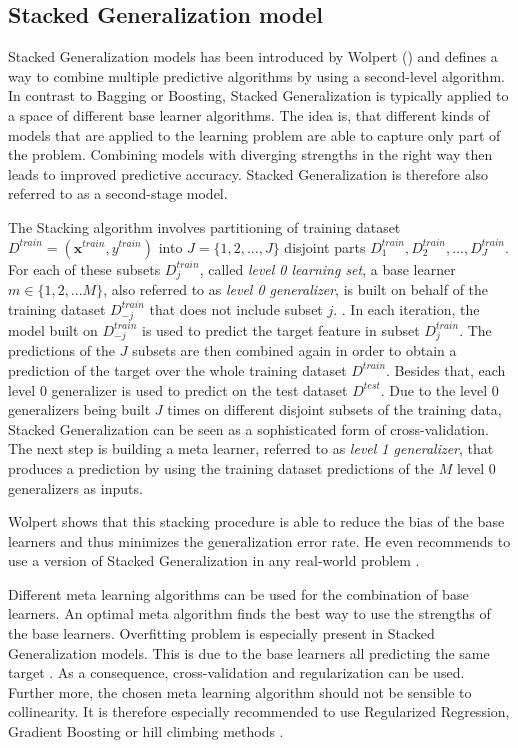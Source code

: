 \documentclass[12pt]{article}
\begin{document}

\subsection{Stacked Generalization model}\label{stacking}
Stacked Generalization models has been introduced by Wolpert (\citeyear{wolpert1992stacked}) and defines a way to combine multiple predictive algorithms by using a second-level algorithm. In contrast to Bagging or Boosting, Stacked Generalization is typically applied to a space of different base learner algorithms. The idea is, that different kinds of models that are applied to the learning problem are able to capture only part of the problem. Combining models with diverging strengths in the right way then leads to improved predictive accuracy. Stacked Generalization is therefore also referred to as a second-stage model.

The Stacking algorithm involves partitioning of training dataset $D^{train} = (\mathbf{x}^{train}, y^{train})$ into $J = \{1, 2,..., J\}$ disjoint parts $D^{train}_1, D^{train}_2,..., D^{train}_J$. For each of these subsets $D^{train}_j$, called \textit{level 0 learning set}, a base learner $m \in \{1,2,...M\}$, also referred to as \textit{level 0 generalizer}, is built on behalf of the training dataset $D^{train}_{-j}$ that does not include subset $j$. \citep[cp.]{wolpert1992stacked}. In each iteration, the model built on $D^{train}_{-j}$ is used to predict the target feature in subset $D^{train}_j$. The predictions of the $J$ subsets are then combined again in order to obtain a prediction of the target over the whole training dataset $D^{train}$. Besides that, each level 0 generalizer is used to predict on the test dataset $D^{test}$. Due to the level 0 generalizers being built $J$ times on different disjoint subsets of the training data, Stacked Generalization can be seen as a sophisticated form of cross-validation. The next step is building a meta learner, referred to as \textit{level 1 generalizer}, that produces a prediction by using the training dataset predictions of the $M$ level 0 generalizers as inputs. 

Wolpert shows that this stacking procedure is able to reduce the bias of the base learners and thus minimizes the generalization error rate. He even recommends to use a version of Stacked Generalization in any real-world problem \citep[p.2]{wolpert1992stacked}. 

Different meta learning algorithms can be used for the combination of base learners. An optimal meta algorithm finds the best way to use the strengths of the base learners. Overfitting problem is especially present in Stacked Generalization models. This is due to the base learners all predicting the same target \citep{online2017stacking}. As a consequence, cross-validation and regularization can be used. Further more, the chosen meta learning algorithm should not be sensible to collinearity. It is therefore especially recommended to use Regularized Regression, Gradient Boosting or hill climbing methods \citep{SASpaper}. 
\end{document}
